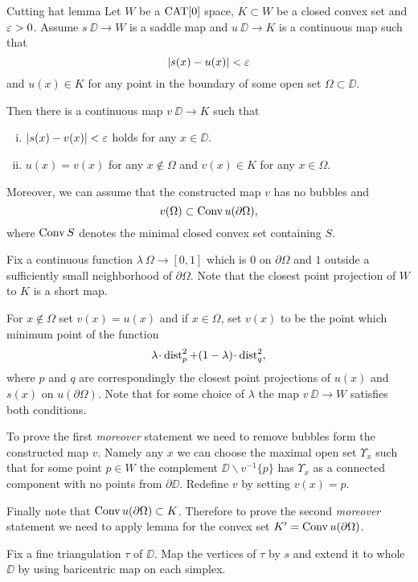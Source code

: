 \documentclass[a4paper,10pt]{amsart}
\begin{document}
\begin{thm}{Cutting hat lemma}\label{lem:cutting-hat}
Let 
$W$ be a $\mathop{\rm CAT}\nolimits[0]$ space, 
$K\subset W$ be a closed convex set 
and $\varepsilon>0$.
Assume $s\:\DD\to W$ is a saddle map 
and $u\:\DD\to K$ is a continuous map such that 
\[|s(x)-u(x)|<\varepsilon\]
and $u(x)\in K$ for any point in the boundary of some open set $\Omega\subset \DD$.

Then there is a continuous map $v\:\DD\to K$ such that 
\begin{enumerate}[(i)]
\item $|s(x)-v(x)|<\varepsilon$ holds for any $x\in\DD$.
\item $u(x)=v(x)$ for any $x\notin\Omega$ and
$v(x)\in K$ for any $x\in\Omega$.
\end{enumerate}
Moreover, we can assume that the constructed map $v$ has no bubbles
and 
\[v(\Omega)\subset \mathop{\rm Conv}\nolimits u(\partial\Omega),\]
where $\mathop{\rm Conv}\nolimits S$ denotes the minimal closed convex set containing $S$.
\end{thm}

Fix a continuous function $\lambda\:\Omega\to [0,1]$
which is $0$ on $\partial \Omega$ and $1$ outside a sufficiently small neighborhood of $\partial \Omega$.
Note that the closest point projection of $W$ to $K$ is a short map.

For $x\notin \Omega$ set $v(x)=u(x)$ and if 
$x\in \Omega$, set $v(x)$ to be the point which minimum point of the function 
\[\lambda\cdot\dist^2_p+(1-\lambda)\cdot\dist^2_q,\]
where $p$ and $q$ are correspondingly the closest point projections of  $u(x)$ and $s(x)$ on $u(\partial\Omega)$.
Note that for some choice of $\lambda$ the map $v\:\DD\to W$ satisfies
both conditions.

To prove the first \emph{moreover} statement we need to remove bubbles form the constructed map $v$.
Namely any $x$ we can choose the maximal open set $\Upsilon_x$ such that for some point $p\in W$ the complement $\DD\backslash v^{-1}\{p\}$ has $\Upsilon_x$ as a
connected component with no points from $\partial \DD$.
Redefine $v$ by setting $v(x)=p$.

Finally note that $\mathop{\rm Conv}\nolimits u(\partial\Omega)\subset K$. 
Therefore to prove the second \emph{moreover} statement 
we need to apply lemma for the convex set $K'=\mathop{\rm Conv}\nolimits u(\partial\Omega)$.
\qeds





Fix a fine triangulation $\tau$ of $\DD$.
Map the vertices of $\tau$ by $s$
and extend it to whole $\DD$ by using baricentric map on each simplex.
\end{document}

